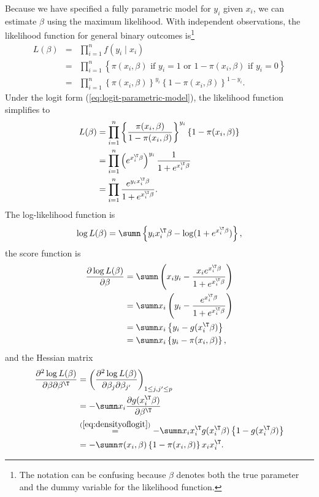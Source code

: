 Because we have specified a fully parametric model for $y_{i}$ given
$x_{i}$, we can estimate $\beta$ using the maximum likelihood. With
independent observations,   the likelihood function for
general binary outcomes is\footnote{The notation can be confusing because $\beta$ denotes both the true parameter and the dummy variable for the likelihood function.}
\begin{eqnarray*}
L(\beta) &=& 
\prod_{i=1}^{n} f(y_i\mid x_i) \\
&=& 
\prod_{i=1}^{n}   \left\{  \pi(x_{i},\beta) \text{ if } y_i = 1 \text{ or } 1-\pi(x_{i},\beta) \text{ if } y_i = 0  \right\} \\
&=&
\prod_{i=1}^{n}\left\{ \pi(x_{i},\beta)\right\} ^{y_{i}}\left\{ 1-\pi(x_{i},\beta)\right\} ^{1-y_{i}}.
\end{eqnarray*}
Under the logit form (\ref{eq:logit-parametric-model}), the likelihood function simplifies to
\begin{align*}
L(\beta) & =\prod_{i=1}^{n}\left\{ \frac{\pi(x_{i},\beta)}{1-\pi(x_{i},\beta)}\right\} ^{y_{i}}\left\{ 1-\pi(x_{i},\beta)\right\} \\
 & =\prod_{i=1}^{n}\left(e^{x_{i}^{\T}\beta}\right)^{y_{i}}\frac{1}{1+e^{x_{i}^{\T}\beta}}\\
 & =\prod_{i=1}^{n}\frac{e^{y_{i}x_{i}^{\T}\beta}}{1+e^{x_{i}^{\T}\beta}}.
\end{align*}
The log-likelihood function is
\[
\log L(\beta)=\sumn\left\{ y_{i}x_{i}^{\T}\beta-\log(1+e^{x_{i}^{\T}\beta})\right\} ,
\]
the score function is
\begin{align*}
\frac{\partial\log L(\beta)}{\partial\beta} & =\sumn\left(x_{i}y_{i}-\frac{x_{i}e^{x_{i}^{\T}\beta}}{1+e^{x_{i}^{\T}\beta}}\right)\\
 & =\sumn x_{i}\left(y_{i}-\frac{e^{x_{i}^{\T}\beta}}{1+e^{x_{i}^{\T}\beta}}\right)\\
 &= \sumn x_{i}\left\{  y_{i}-  g(x_{i}^{\T} \beta)  \right\} \\
 & =\sumn x_{i}\left\{ y_{i}-\pi(x_{i},\beta)\right\} ,
\end{align*}
and the Hessian matrix
\begin{align*}
\frac{\partial^{2}\log L(\beta)}{\partial\beta\partial\beta^{\T}} & =\left(\frac{\partial^{2}\log L(\beta)}{\partial\beta_{j}\partial\beta_{j'}}\right)_{1\leq j,j'\leq p}\\
 & =-\sumn x_{i}\frac{\partial g(x_{i}^{\T}\beta)}{\partial\beta^{\T}}\\
 & \stackrel{(\ref{eq:densityoflogit})}{=}-\sumn x_{i}x_{i}^{\T}g(x_{i}^{\T}\beta)\left\{ 1-g(x_{i}^{\T}\beta)\right\} \\
 & =-\sumn\pi(x_{i},\beta)\left\{ 1-\pi(x_{i},\beta)\right\} x_{i}x_{i}^{\T}.
\end{align*}

